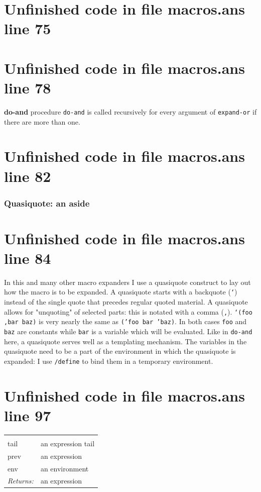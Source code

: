 \documentclass[twoside,9pt]{report}
\begin{document}
\section{Unfinished code in file macros.ans line 75}

\section{Unfinished code in file macros.ans line 78}

\textbf{do-and} procedure \texttt{do-and} is called recursively for every argument of \texttt{expand-or} if there are more than one.

\section{Unfinished code in file macros.ans line 82}
\subsubsection{Quasiquote: an aside}
\label{quasiquote-an-aside}
\section{Unfinished code in file macros.ans line 84}


In this and many other macro expanders I use a quasiquote construct to lay out how the macro is to be expanded. A quasiquote starts with a backquote (\texttt{`}) instead of the single quote that precedes regular quoted material. A quasiquote allows for "unquoting" of selected parts: this is notated with a comma (\texttt{,}). \texttt{`(foo ,bar baz)} is very nearly the same as \texttt{('foo bar 'baz)}. In both cases \texttt{foo} and \texttt{baz} are constants while \texttt{bar} is a variable which will be evaluated. Like in \texttt{do-and} here, a quasiquote serves well as a templating mechanism. The variables in the quasiquote need to be a part of the environment in which the quasiquote is expanded: I use \texttt{/define} to bind them in a temporary environment.

\section{Unfinished code in file macros.ans line 97}
\noindent\begin{tabular}{ |p{1.9cm} p{8cm}| }
\hline
\rowcolor[HTML]{CCCCCC} \multicolumn{2}{|l|}{\bf do-and (internal)} \\
tail & an expression tail \\
prev & an expression \\
env & an environment \\
\textit{Returns:} & an expression \\
\hline
\end{tabular}
\end{document}
